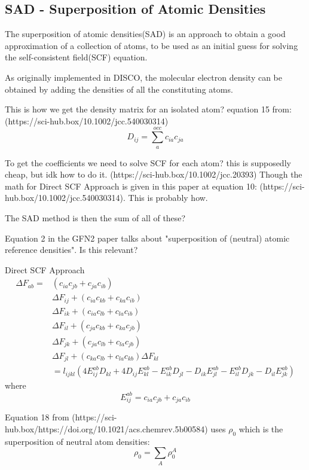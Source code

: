 \subsection{SAD - Superposition of Atomic Densities}

The superposition of atomic densities(SAD) is an approach to obtain a good approximation of a collection of atoms, to be used as an initial guess for solving the self-consistent field(SCF) equation.

As originally implemented in DISCO, the molecular electron density can be obtained by adding the densities of all the constituting atoms.



This is how we get the density matrix for an isolated atom? equation 15 from: (https://sci-hub.box/10.1002/jcc.540030314)
\begin{equation}
  D_{ij} = \sum_a^{occ} c_{ia} c_{ja}
\end{equation}

To get the coefficients we need to solve SCF for each atom? this is supposedly cheap, but idk how to do it. (https://sci-hub.box/10.1002/jcc.20393)
Though the math for Direct SCF Approach is given in this paper at equation 10: (https://sci-hub.box/10.1002/jcc.540030314). This is probably how.

The SAD method is then the sum of all of these?

Equation 2 in the GFN2 paper talks about "superposition of (neutral) atomic reference densities". Is this relevant?

Direct SCF Approach
\begin{equation}
\begin{split}
  \Delta F_{ab} = &(c_{ia}c_{jb} + c_{ja}c_{ib})\\
  &\Delta F_{ij} + (c_{ia}c_{kb} + c_{ka}c_{ib})\\
  &\Delta F_{ik} + (c_{ia}c_{lb} + c_{la}c_{ib})\\
  &\Delta F_{il} + (c_{ja}c_{kb} + c_{ka}c_{jb})\\
  &\Delta F_{jk} + (c_{ja}c_{lb} + c_{la}c_{jb})\\
  &\Delta F_{jl} + (c_{ka}c_{lb} + c_{la}c_{kb}) \Delta F_{kl}\\
  &= l_{ijkl}(4E_{ij}^{ab}D_{kl} + 4D_{ij}E_{kl}^{ab} - E_{ik}^{ab}D_{jl} - D_{ik}E_{jl}^{ab} - E_{il}^{ab}D_{jk} - D_{il}E_{jk}^{ab})
\end{split}
\end{equation}
where
\begin{equation}
  E_{ij}^{ab} = c_{ia}c_{jb} + c_{ja}c_{ib}
\end{equation}


Equation 18 from (https://sci-hub.box/https://doi.org/10.1021/acs.chemrev.5b00584) uses \(\rho_0\) which is the superposition of neutral atom densities:
\begin{equation}
  \rho_0 = \sum_A \rho_0^A
\end{equation}
